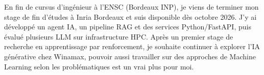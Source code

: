 
\begin{cvparagraph}
En fin de cursus d’ingénieur à l’ENSC (Bordeaux INP), je viens de terminer mon stage de fin d’études à Inria Bordeaux et suis disponible dès octobre 2026. J’y ai développé un agent IA, un pipeline RAG et des services Python/FastAPI, puis évalué plusieurs LLM sur infrastructure HPC. Après un premier stage de recherche en apprentissage par renforcement, je souhaite continuer à explorer l’IA générative chez Winamax, pouvoir aussi travailler sur des approches de Machine Learning selon les problématiques est un vrai plus pour moi.
\end{cvparagraph}

